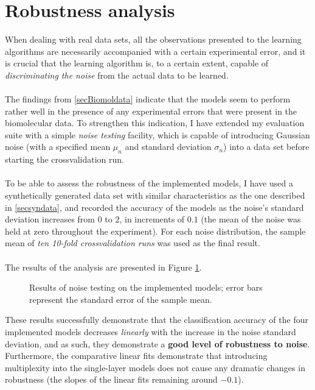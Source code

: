 \documentclass[12pt,a4paper,twoside,openright]{report}
\begin{document}
\section{Robustness analysis}\label{secnojz}

When dealing with real data sets, all the observations presented to the learning algorithms are necessarily accompanied with a certain experimental error, and it is crucial that the learning algorithm is, to a certain extent, capable of \emph{discriminating the noise} from the actual data to be learned.\\ \\
The findings from \cref{secBiomoldata} indicate that the models seem to perform rather well in the presence of any experimental errors that were present in the biomolecular data. To strengthen this indication, I have extended my evaluation suite with a simple \emph{noise testing} facility, which is capable of introducing Gaussian noise (with a specified mean $\mu_n$ and standard deviation $\sigma_n$) into a data set before starting the crossvalidation run.\\ \\
To be able to assess the robustness of the implemented models, I have used a synthetically generated data set with similar characteristics as the one described in \cref{secsyndata}, and recorded the accuracy of the models as the noise's standard deviation increases from $0$ to $2$, in increments of $0.1$ (the mean of the noise was held at zero throughout the experiment). For each noise distribution, the sample mean of \emph{ten 10-fold crossvalidation runs} was used as the final result.\\ \\
The results of the analysis are presented in Figure \ref{fignoise1}.%
\begin{figure}[p]\centering
{}

\caption[Results of noise testing on the chain GMHMM models]{\centering Results of noise testing on the implemented models; error bars represent the standard error of the sample mean.}\label{fignoise1}
\end{figure}
These results successfully demonstrate that the classification accuracy of the four implemented models decreases \emph{linearly} with the increase in the noise standard deviation, and as such, they demonstrate a {\bf good level of robustness to noise}. Furthermore, the comparative linear fits demonstrate that introducing multiplexity into the single-layer models does not cause any dramatic changes in robustness (the slopes of the linear fits remaining around $-0.1$).
\end{document}
